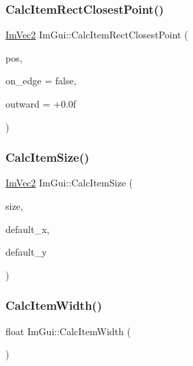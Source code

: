 \hypertarget{namespace_im_gui_a6c66a7acf7e6eef639b5f1211d8332a3}{}\label{namespace_im_gui_a6c66a7acf7e6eef639b5f1211d8332a3} 
\subsubsection{\texorpdfstring{Calc\+Item\+Rect\+Closest\+Point()}{CalcItemRectClosestPoint()}}
{\footnotesize\ttfamily \hyperlink{struct_im_vec2}{Im\+Vec2} Im\+Gui\+::\+Calc\+Item\+Rect\+Closest\+Point (\begin{DoxyParamCaption}\item[{const \hyperlink{struct_im_vec2}{Im\+Vec2} \&}]{pos,  }\item[{bool}]{on\+\_\+edge = {\ttfamily false},  }\item[{float}]{outward = {\ttfamily +0.0f} }\end{DoxyParamCaption})}

\hypertarget{namespace_im_gui_a3c1505e785f9571ed82500692a727c5f}{}\label{namespace_im_gui_a3c1505e785f9571ed82500692a727c5f} 
\subsubsection{\texorpdfstring{Calc\+Item\+Size()}{CalcItemSize()}}
{\footnotesize\ttfamily \hyperlink{struct_im_vec2}{Im\+Vec2} Im\+Gui\+::\+Calc\+Item\+Size (\begin{DoxyParamCaption}\item[{\hyperlink{struct_im_vec2}{Im\+Vec2}}]{size,  }\item[{float}]{default\+\_\+x,  }\item[{float}]{default\+\_\+y }\end{DoxyParamCaption})}

\hypertarget{namespace_im_gui_ab3b3ba92ebd8bca4a552dd93321a1994}{}\label{namespace_im_gui_ab3b3ba92ebd8bca4a552dd93321a1994} 
\subsubsection{\texorpdfstring{Calc\+Item\+Width()}{CalcItemWidth()}}
{\footnotesize\ttfamily float Im\+Gui\+::\+Calc\+Item\+Width (\begin{DoxyParamCaption}{ }\end{DoxyParamCaption})}

